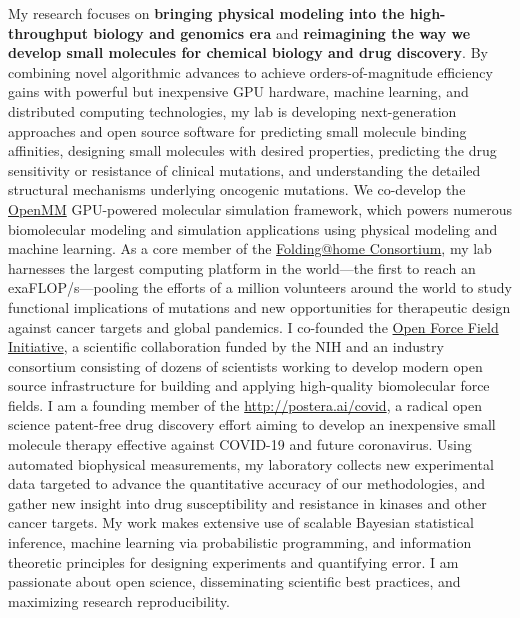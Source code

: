 \documentclass[10pt]{article}
\begin{document}
My research focuses on {\bf bringing physical modeling into the high-throughput biology and genomics era} and {\bf reimagining the way we develop small molecules for chemical biology and drug discovery}.
By combining novel algorithmic advances to achieve orders-of-magnitude efficiency gains with powerful but inexpensive GPU hardware, machine learning, and distributed computing technologies, my lab is developing next-generation approaches and open source software for predicting small molecule binding affinities, designing small molecules with desired properties, predicting the drug sensitivity or resistance of clinical mutations, and understanding the detailed structural mechanisms underlying oncogenic mutations.
We co-develop the \href{http://openmm.org}{OpenMM} GPU-powered molecular simulation framework, which powers numerous biomolecular modeling and simulation applications using physical modeling and machine learning. 
As a core member of the \href{https://foldingathome.stanford.edu/about/the-foldinghome-consortium/}{Folding@home Consortium}, my lab harnesses the largest computing platform in the world---the first to reach an exaFLOP/s---pooling the efforts of a million volunteers around the world to study functional implications of mutations and new opportunities for therapeutic design against cancer targets and global pandemics.
I co-founded the \href{http://openforcefield.org}{Open Force Field Initiative}, a scientific collaboration funded by the NIH and an industry consortium consisting of dozens of scientists working to develop modern open source infrastructure for building and applying high-quality biomolecular force fields.
I am a founding member of the \href{COVID Moonshot}{http://postera.ai/covid}, a radical open science patent-free drug discovery effort aiming to develop an inexpensive small molecule therapy effective against COVID-19 and future coronavirus.
Using automated biophysical measurements, my laboratory collects new experimental data targeted to advance the quantitative accuracy of our methodologies, and gather new insight into drug susceptibility and resistance in kinases and other cancer targets.
My work makes extensive use of scalable Bayesian statistical inference, machine learning via probabilistic programming, and information theoretic principles for designing experiments and quantifying error.
I am passionate about open science, disseminating scientific best practices, and maximizing research reproducibility.
\end{document}
